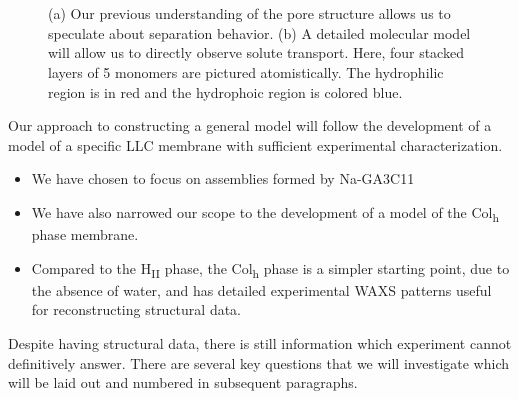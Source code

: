 \documentclass{article}
\begin{document}
\begin{figure}
\begin{subfigure}{0.45\linewidth}
		\caption{}~\label{fig:detailed_pore}
	\end{subfigure}
  \caption{(a) Our previous understanding of the pore structure allows us to speculate
	   about separation behavior. (b) A detailed molecular model will allow us to
	   directly observe solute transport. Here, four stacked layers of 5 monomers
           are pictured atomistically. The hydrophilic region is in red and the 
	   hydrophoic region is colored blue.}~\label{fig:detail}
  \end{figure} 
	
  
  Our approach to constructing a general model will follow the development of a
  model of a specific LLC membrane with sufficient experimental characterization.
    \begin{itemize}
	    \item We have chosen to focus on assemblies formed by Na-GA3C11
	    \item We have also narrowed our scope to the development of 
	    a model of the Col\textsubscript{h} phase membrane.
	    \item Compared to the H\textsubscript{II} phase, the Col\textsubscript{h}
	    phase is a simpler starting point, due to the absence of water, and has
	    detailed experimental WAXS patterns useful for reconstructing structural data.  
    \end{itemize}

  Despite having structural data, there is still information which
  experiment cannot definitively answer. There are several key
  questions that we will investigate  
which will be laid out and numbered
  in subsequent paragraphs.

\end{document}
